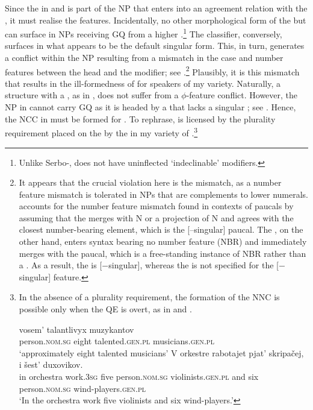 \documentclass[output=paper,modfonts,newtxmath,hidelinks]{langscibook}
\begin{document}
\noindent Since the  in  and  is part of the NP that enters into an agreement relation with the , it must realise the   features. Incidentally, no other morphological form of the  but   can surface in NPs receiving GQ from a higher .\footnote{\label{18:fn15} Unlike Serbo-,  does not have uninflected ‘indeclinable’ modifiers.} The classifier, conversely, surfaces in what appears to be the default  singular form. This, in turn, generates a conflict within the NP resulting from a mismatch in the case and number features between the head and the modifier; see .\footnote{\label{18:fn16} It appears that the crucial violation here is the  mismatch, as a number feature mismatch is tolerated in  NPs that are complements to lower numerals. \citet{Pesetsky2013} accounts for the number feature mismatch found in contexts of paucals by assuming that the  merges with N or a projection of N and agrees with the closest number-bearing element, which is the [–singular] paucal. The , on the other hand, enters syntax bearing no number feature (NBR) and immediately merges with the paucal, which is a free-standing instance of NBR rather than a . As a result, the  is [$-$singular], whereas the  is not specified for the [$-$singular] feature.} Plausibly, it is this mismatch that results in the ill-formedness of  for speakers of my variety. Naturally, a structure with a  , as in , does not suffer from a ${\phi}${}-feature conflict. However, the NP in  cannot carry GQ as it is headed by a  that lacks a singular ; see . Hence, the NCC in  must be formed for . To rephrase,  is licensed by the plurality requirement placed on the  by the  in my variety of .\footnote{\label{18:fn17}In the absence of a plurality requirement, the formation of the NNC is possible only when the QE is overt, as in  and .   

\ea \label{18:fn17i}
\gll {}      vosem’  talantlivyx  muzykantov \\  
	 person.\textsc{nom.sg} eight  talented.\textsc{gen.pl}  musicians.\textsc{gen.pl} \\
\glt `approximately eight talented musicians'  
\z
\ea\label{18:fn17ii}
\gll V orkestre rabotajet pjat’  skripačej, i šest’  duxovikov. \\
	 in orchestra work.\textsc{3sg} five person.\textsc{nom.sg} violinists.\textsc{gen.pl} and six person.\textsc{nom.sg} wind-players.\textsc{gen.pl} \\
\glt `In the orchestra work five violinists and six wind-players.'
\zlast
}
\end{document}
